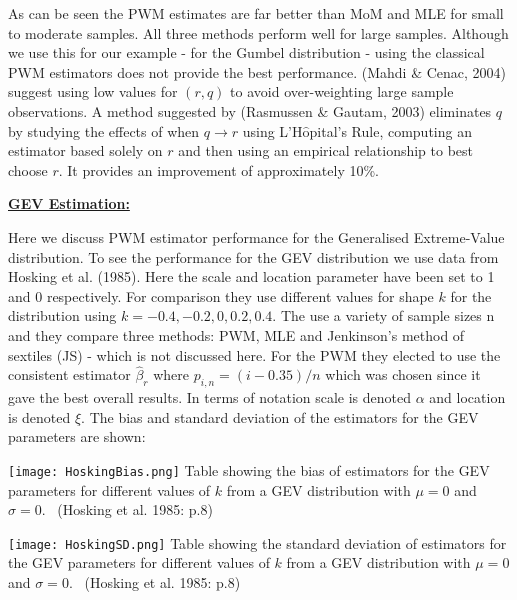 \documentclass{article}
\begin{document}
\normalsize
As can be seen the PWM estimates are far better than MoM and MLE for small to moderate samples. All three methods perform well for large samples. Although we use this for our example - for the Gumbel distribution - using the classical PWM estimators does not provide the best performance. (Mahdi \& Cenac, 2004) suggest using low values for $(r,q)$ to avoid over-weighting large sample observations. A method suggested by (Rasmussen \& Gautam, 2003) eliminates $q$ by studying the effects of when $q \to r$ using L'H$\hat{\text{o}}$pital's Rule, computing an estimator based solely on $r$ and then using an empirical relationship to best choose $r$. It provides an improvement of approximately 10\%.\vspace{-0.2cm}



\underline{\textbf{GEV Estimation:}}\vspace{-0.2cm}

Here we discuss PWM estimator performance for the Generalised Extreme-Value distribution. To see the performance for the GEV distribution we use data from Hosking et al. (1985). Here the scale and location parameter have been set to 1 and 0 respectively. For comparison they  use different values for shape $k$ for the distribution using $k = -0.4, -0.2, 0, 0.2, 0.4$. The use a variety of sample sizes n and they compare three methods: PWM, MLE and Jenkinson's method of sextiles (JS) - which is not discussed here. For the PWM they elected to use the consistent estimator $\hat{\beta}_r$ where $p_{i,n} = (i-0.35)/n$ which was chosen since it gave the best overall results. In terms of notation scale is denoted $\alpha$ and location is denoted $\xi$. The bias and standard deviation of the estimators for the GEV parameters are shown: 

\texttt{[image: HoskingBias.png]}
\small{Table showing the bias of estimators for the GEV parameters for different values of $k$ from a GEV distribution with $\mu = 0$ and $\sigma = 0$. \ (Hosking et al. 1985: p.8)}\normalsize

\hspace{-0.8cm}\texttt{[image: HoskingSD.png]}
\small{Table showing the standard deviation of estimators for the GEV parameters for different values of $k$ from a GEV distribution with $\mu = 0$ and $\sigma = 0$. \ (Hosking et al. 1985: p.8)}\normalsize
\vspace{0.5cm}
\end{document}
